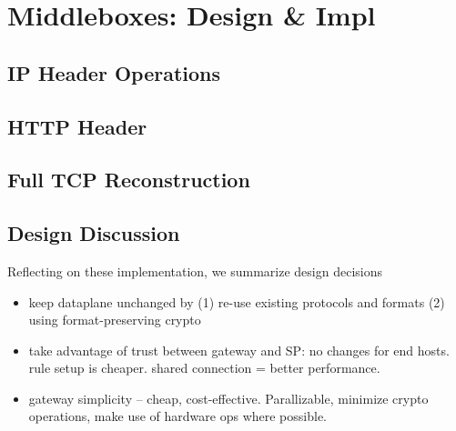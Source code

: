 
\section{Middleboxes: Design \& Impl}

\subsection{IP Header Operations}

\subsection{HTTP Header}

\subsection{Full TCP Reconstruction}


\subsection{Design Discussion}
Reflecting on these implementation, we summarize design decisions
\begin{itemize}
  \item keep dataplane unchanged by (1) re-use existing protocols and formats (2) using format-preserving crypto
  \item take advantage of trust between gateway and SP: no changes for end hosts. rule setup is cheaper. shared connection = better performance.
  \item gateway simplicity -- cheap, cost-effective. Parallizable, minimize crypto operations, make use of hardware ops where possible. 
\end{itemize}
